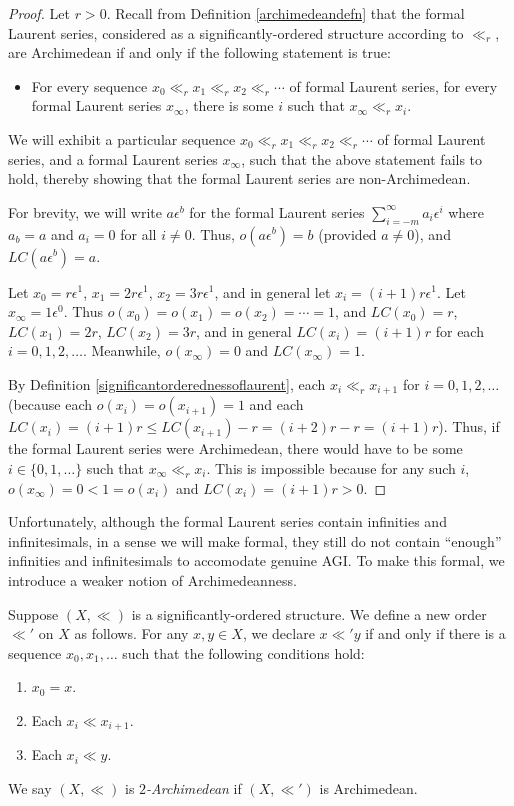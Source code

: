 \documentclass[twoside,11pt]{article}
\begin{document}
\begin{proof}
    Let $r>0$.
    Recall from Definition \ref{archimedeandefn} that the formal Laurent series,
    considered as a significantly-ordered structure according to $\ll_r$, are
    Archimedean if and only if the following statement is true:
    \begin{itemize}
    \item
        For every sequence $x_0\ll_r x_1\ll_r x_2 \ll_r \cdots$ of formal Laurent series,
        for every formal Laurent series $x_\infty$, there is some $i$ such that
        $x_\infty\ll_r x_i$.
    \end{itemize}
    We will exhibit a particular sequence $x_0\ll_r x_1\ll_r x_2\ll_r\cdots$
    of formal Laurent series, and a formal Laurent series $x_\infty$, such that the
    above statement fails to hold, thereby showing that the formal Laurent series
    are non-Archimedean.

    For brevity, we will write $a\epsilon^b$ for the formal Laurent series
    $\sum_{i=-m}^{\infty} a_i\epsilon^i$ where $a_b=a$ and $a_i=0$ for all $i\not=0$.
    Thus, $o(a\epsilon^b)=b$ (provided $a\not=0$), and $LC(a\epsilon^b)=a$.

    Let $x_0=r\epsilon^1$, $x_1=2r\epsilon^1$, $x_2=3r\epsilon^1$, and in general let
    $x_i=(i+1)r\epsilon^1$. Let $x_\infty=1\epsilon^0$.
    Thus $o(x_0)=o(x_1)=o(x_2)=\cdots=1$,
    and $LC(x_0)=r$, $LC(x_1)=2r$, $LC(x_2)=3r$, and in general $LC(x_i)=(i+1)r$
    for each $i=0,1,2,\ldots$. Meanwhile, $o(x_\infty)=0$ and $LC(x_\infty)=1$.

    By Definition \ref{significantorderednessoflaurent},
    each $x_i\ll_r x_{i+1}$ for $i=0,1,2,\ldots$ (because each $o(x_i)=o(x_{i+1})=1$
    and each $LC(x_i)=(i+1)r\leq LC(x_{i+1})-r=(i+2)r-r=(i+1)r$).
    Thus, if the formal Laurent series were Archimedean, there would have to be some
    $i\in\{0,1,\ldots\}$
    such that $x_\infty\ll_r x_i$. This is impossible because
    for any such $i$, $o(x_\infty)=0<1=o(x_i)$ and $LC(x_i)=(i+1)r>0$.
\end{proof}

Unfortunately, although the formal Laurent series contain infinities and infinitesimals,
in a sense we will make formal, they still do not contain ``enough'' infinities and
infinitesimals to accomodate genuine AGI. To make this formal, we introduce a weaker
notion of Archimedeanness.

\begin{definition}
Suppose $(X,\ll)$ is a significantly-ordered structure.
We define a new order $\ll'$ on $X$ as follows.
For any $x,y\in X$, we declare $x\ll' y$ if and only if there is a sequence
$x_0,x_1,\ldots$ such that the following conditions hold:
\begin{enumerate}
    \item
    $x_0=x$.
    \item
    Each $x_i\ll x_{i+1}$.
    \item
    Each $x_i\ll y$.
\end{enumerate}
We say $(X,\ll)$ is \emph{$2$-Archimedean} if $(X,\ll')$ is Archimedean.
\end{definition}
\end{document}
